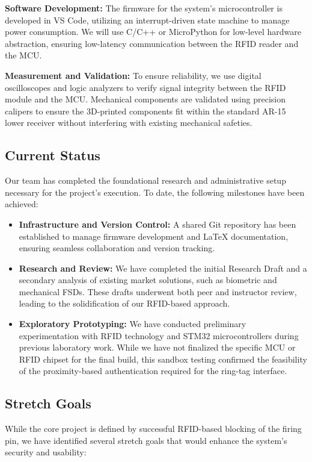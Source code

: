 \textbf{Software Development:} The firmware for the system’s microcontroller is developed in VS Code, utilizing an interrupt-driven state machine to manage power consumption. We will use C/C++ or MicroPython for low-level hardware abstraction, ensuring low-latency communication between the RFID reader and the MCU.

\textbf{Measurement and Validation:} To ensure reliability, we use digital oscilloscopes and logic analyzers to verify signal integrity between the RFID module and the MCU. Mechanical components are validated using precision calipers to ensure the 3D-printed components fit within the standard AR-15 lower receiver without interfering with existing mechanical safeties.

\subsection{Current Status}
Our team has completed the foundational research and administrative setup necessary for the project’s execution. To date, the following milestones have been achieved:

\begin{itemize}
    \item \textbf{Infrastructure and Version Control:} A shared Git repository has been established to manage firmware development and LaTeX documentation, ensuring seamless collaboration and version tracking.
    \item \textbf{Research and Review:} We have completed the initial Research Draft and a secondary analysis of existing market solutions, such as biometric and mechanical FSDs. These drafts underwent both peer and instructor review, leading to the solidification of our RFID-based approach.
    \item \textbf{Exploratory Prototyping:} We have conducted preliminary experimentation with RFID technology and STM32 microcontrollers during previous laboratory work. While we have not finalized the specific MCU or RFID chipset for the final build, this sandbox testing confirmed the feasibility of the proximity-based authentication required for the ring-tag interface.
\end{itemize}

\subsection{Stretch Goals}
While the core project is defined by successful RFID-based blocking of the firing pin, we have identified several stretch goals that would enhance the system’s security and usability:

